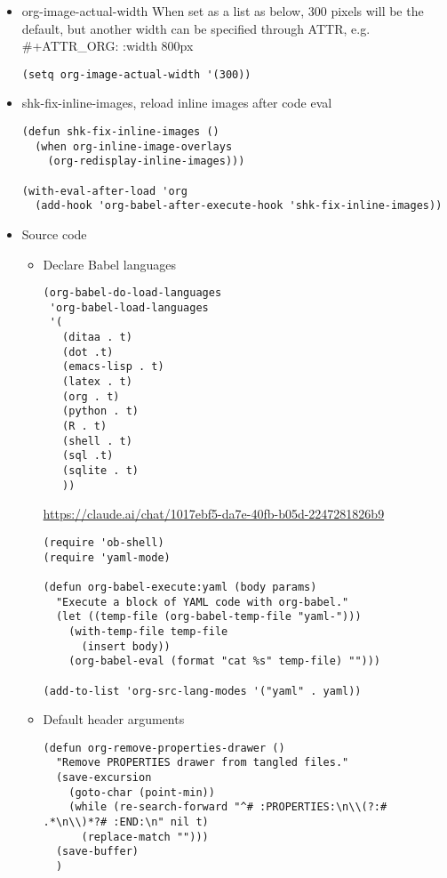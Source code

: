 \documentclass{article}
\begin{document}
\begin{itemize}
\begin{itemize}
\begin{itemize}
\item org-image-actual-width
\label{sec:orgf5635eb}
When set as a list as below, 300 pixels will be the default, but another width can be specified through ATTR, e.g. \#+ATTR\_ORG: :width 800px
\begin{verbatim}
(setq org-image-actual-width '(300))
\end{verbatim}
\item shk-fix-inline-images, reload inline images after code eval
\label{sec:orgae00f91}
\begin{verbatim}
(defun shk-fix-inline-images ()
  (when org-inline-image-overlays
    (org-redisplay-inline-images)))

(with-eval-after-load 'org
  (add-hook 'org-babel-after-execute-hook 'shk-fix-inline-images))

\end{verbatim}

\item Source code
\label{sec:org7f8f27f}

\begin{itemize}
\item Declare Babel languages
\label{sec:org8148fef}


\begin{verbatim}
(org-babel-do-load-languages
 'org-babel-load-languages
 '(
   (ditaa . t)
   (dot .t)
   (emacs-lisp . t)
   (latex . t)
   (org . t)
   (python . t)
   (R . t)
   (shell . t)
   (sql .t)
   (sqlite . t)
   ))
\end{verbatim}

\url{https://claude.ai/chat/1017ebf5-da7e-40fb-b05d-2247281826b9}

\begin{verbatim}
(require 'ob-shell)
(require 'yaml-mode)

(defun org-babel-execute:yaml (body params)
  "Execute a block of YAML code with org-babel."
  (let ((temp-file (org-babel-temp-file "yaml-")))
    (with-temp-file temp-file
      (insert body))
    (org-babel-eval (format "cat %s" temp-file) "")))

(add-to-list 'org-src-lang-modes '("yaml" . yaml))
\end{verbatim}
\item Default header arguments
\label{sec:org3b596fa}
\begin{verbatim}
(defun org-remove-properties-drawer ()
  "Remove PROPERTIES drawer from tangled files."
  (save-excursion
    (goto-char (point-min))
    (while (re-search-forward "^# :PROPERTIES:\n\\(?:# .*\n\\)*?# :END:\n" nil t)
      (replace-match "")))
  (save-buffer)
  )


\end{verbatim}
\end{itemize}
\end{itemize}
\end{itemize}
\end{itemize}
\end{document}
